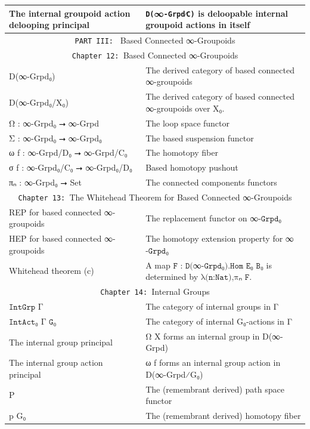 \documentclass{book}
\theoremstyle{definition}
\begin{document}
{\begin{longtable}{|| l || l ||}
\hline
The internal groupoid action delooping principal & \texttt{D(}∞\texttt{-Grpd⁄C)} is deloopable internal groupoid actions in itself \\
\hline \hline
 \multicolumn{2}{||c||}{\texttt{PART III: } Based Connected ∞-Groupoids} \\
\hline \hline
\multicolumn{2}{||c||}{\texttt{Chapter 12: }Based Connected ∞-Groupoids} \\
\hline \hline
D(∞-Grpd₀) & The derived category of based connected ∞-groupoids \\
\hline
D(∞-Grpd₀/X₀) & The derived category of based connected ∞-groupoids over X₀. \\
\hline
Ω : ∞-Grpd₀ ⭢ ∞-Grpd & The loop space functor \\
\hline
Σ : ∞-Grpd₀ ⭢ ∞-Grpd₀ & The based suspension functor \\
\hline 
ω f : ∞-Grpd/D₀ ⭢ ∞-Grpd/C₀ & The homotopy fiber\\
\hline 
σ f : ∞-Grpd₀/C₀ ⭢ ∞-Grpd₀/D₀ & Based homotopy pushout \\
 \hline 
πₙ : ∞-Grpd₀ ⭢ Set & The connected components functors\\
 \hline \hline
  \multicolumn{2}{||c||}{\texttt{Chapter 13: }The Whitehead Theorem for Based Connected ∞-Groupoids} \\
\hline \hline
REP for based connected ∞-groupoids & The replacement functor on ∞$\texttt{-Grpd}$₀ \\
\hline
HEP for based connected ∞-groupoids & The homotopy extension property for ∞$\texttt{-Grpd}$₀\\
 \hline 
Whitehead theorem (c) & A map $\texttt{F : D(}$∞$\texttt{-Grpd₀).Hom E₀ B₀}$ is determined by $\texttt{λ(n:Nat),πₙ F}$. \\
\hline \hline
 \multicolumn{2}{||c||}{\texttt{Chapter 14: }Internal Groups} \\
\hline \hline
 $\texttt{IntGrp Γ}$   & The category of internal groups in Γ  \\
 \hline
 $\texttt{IntAct₀ Γ G₀}$ & The category of internal G₀-actions in Γ   \\
 \hline
 The internal group principal & Ω X forms an internal group in D(∞-Grpd) \\
 \hline
 The internal group action principal & ω f forms an internal group action in D(∞-Grpd⁄G₀) \\
 \hline
 P & The (remembrant derived) path space functor \\ 
\hline
 p G₀ & The (remembrant derived) homotopy fiber  \\

\end{longtable}}
\end{document}

